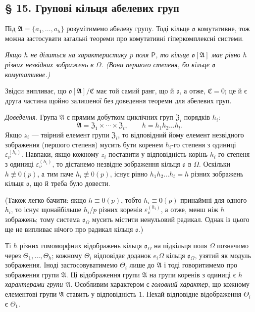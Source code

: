 \documentclass[11pt]{article}
\begin{document}
\subsection*{§ 15. Групові кільця абелевих груп}\label{die-gruppenringe-abelscher-gruppen}

Під \(\mathfrak A=\{a_1,\ldots,a_h\}\) розумітимемо абелеву групу. Тоді кільце \(\mathfrak o\) комутативне, тож можна застосувати загальні теореми про комутативні гіперкомплексні системи.

\emph{Якщо \(h\) не ділиться на характеристику \(p\) поля \(\mathsf P\), то кільце \(\mathfrak o[\mathfrak A]\) має рівно \(h\) різних незвідних зображень в \(\Omega\). (Вони першого степеня, бо кільце \(\mathfrak o\) комутативне.)}

Звідси випливає, що \(\mathfrak o[\mathfrak A]/\mathfrak C\) має той самий ранг, що й \(\mathfrak o\), а отже, \(\mathfrak C=0\); це й є друга частина щойно залишеної без доведення теореми для абелевих груп.

\emph{Доведення.} Група \(\mathfrak A\) є прямим добутком циклічних груп \(\mathfrak Z_i\) порядків \(h_i\):
\[
\mathfrak A=\mathfrak Z_1\times\cdots\times\mathfrak Z_t,\qquad
h=h_1h_2\ldots h_t .
\]
Якщо \(z_i\) --- твірний елемент групи \(\mathfrak Z_i\), то відповідний йому елемент незвідного зображення (першого степеня) мусить бути коренем \(h_i\)-го степеня з одиниці \(\varepsilon_\nu^{(h_i)}\). Навпаки, якщо кожному \(z_i\) поставити у відповідність корінь \(h_i\)-го степеня з одиниці \(\varepsilon_\nu^{(h_i)}\), то дістанемо незвідне зображення кільця \(\mathfrak o\) в \(\Omega\). Оскільки \(h\not\equiv0(p)\), а тим паче \(h_i\not\equiv0(p)\), існує рівно \(h_1h_2\ldots h_t=h\) різних зображень кільця \(\mathfrak o\), що й треба було довести.

(Також легко бачити: якщо \(h\equiv0(p)\), тобто \(h_i\equiv0(p)\) принаймні для одного \(h_i\), то існує щонайбільше \(h_i/p\) різних коренів \(\varepsilon_\nu^{(h_i)}\), а отже, менш ніж \(h\) зображень; тому система \(\mathfrak o_\Omega\) мусить містити ненульовий радикал. Однак із цього ще не випливає нічого про радикал кільця \(\mathfrak o\).)

Ті \(h\) різних гомоморфних відображень кільця \(\mathfrak o_\Omega\) на підкільця поля \(\Omega\) позначимо через \(\Theta_1,\ldots,\Theta_h\); кожному \(\Theta_i\) відповідає доданок \(e_i\Omega\) кільця \(\mathfrak o_\Omega\), узятий як модуль зображення. Іноді застосовуватимемо \(\Theta_i\) лише до \(\mathfrak A\) і тоді говоритимемо про зображення групи \(\mathfrak A\). Ці відображення групи \(\mathfrak A\) на групи коренів з одиниці є \emph{\(h\) характерами групи \(\mathfrak A\)}. Особливим характером є \emph{головний характер}, що кожному елементові групи \(\mathfrak A\) ставить у відповідність \(1\). Нехай відповідне відображення \(\Theta_i\) є \(\Theta_1\).
\end{document}
